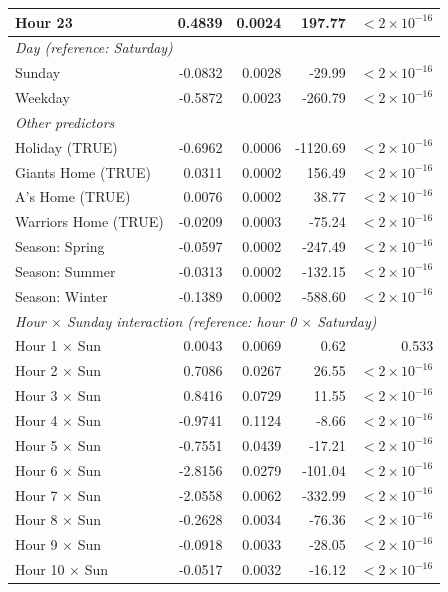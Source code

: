 \documentclass[11pt, letterpaper]{article}
\begin{document}
\begin{longtable}{lrrrr}
Hour 23 &  0.4839 & 0.0024 &   197.77 & $<2\times10^{-16}$ \\
\hline
\multicolumn{5}{l}{\textit{Day (reference: Saturday)}} \\
Sunday  & -0.0832 & 0.0028 &  -29.99 & $<2\times10^{-16}$ \\
Weekday & -0.5872 & 0.0023 & -260.79 & $<2\times10^{-16}$ \\
\hline
\multicolumn{5}{l}{\textit{Other predictors}} \\
Holiday (TRUE)        & -0.6962 & 0.0006 & -1120.69 & $<2\times10^{-16}$ \\
Giants Home (TRUE)    &  0.0311 & 0.0002 &   156.49 & $<2\times10^{-16}$ \\
A's Home (TRUE)       &  0.0076 & 0.0002 &    38.77 & $<2\times10^{-16}$ \\
Warriors Home (TRUE)  & -0.0209 & 0.0003 &   -75.24 & $<2\times10^{-16}$ \\
Season: Spring        & -0.0597 & 0.0002 &  -247.49 & $<2\times10^{-16}$ \\
Season: Summer        & -0.0313 & 0.0002 &  -132.15 & $<2\times10^{-16}$ \\
Season: Winter        & -0.1389 & 0.0002 &  -588.60 & $<2\times10^{-16}$ \\
\hline
\multicolumn{5}{l}{\textit{Hour $\times$ Sunday interaction (reference: hour 0 $\times$ Saturday)}} \\
Hour 1  $\times$ Sun  &  0.0043 & 0.0069 &    0.62 & 0.533 \\
Hour 2  $\times$ Sun  &  0.7086 & 0.0267 &   26.55 & $<2\times10^{-16}$ \\
Hour 3  $\times$ Sun  &  0.8416 & 0.0729 &   11.55 & $<2\times10^{-16}$ \\
Hour 4  $\times$ Sun  & -0.9741 & 0.1124 &   -8.66 & $<2\times10^{-16}$ \\
Hour 5  $\times$ Sun  & -0.7551 & 0.0439 &  -17.21 & $<2\times10^{-16}$ \\
Hour 6  $\times$ Sun  & -2.8156 & 0.0279 & -101.04 & $<2\times10^{-16}$ \\
Hour 7  $\times$ Sun  & -2.0558 & 0.0062 & -332.99 & $<2\times10^{-16}$ \\
Hour 8  $\times$ Sun  & -0.2628 & 0.0034 &  -76.36 & $<2\times10^{-16}$ \\
Hour 9  $\times$ Sun  & -0.0918 & 0.0033 &  -28.05 & $<2\times10^{-16}$ \\
Hour 10 $\times$ Sun  & -0.0517 & 0.0032 &  -16.12 & $<2\times10^{-16}$ \\

\end{longtable}
\end{document}
